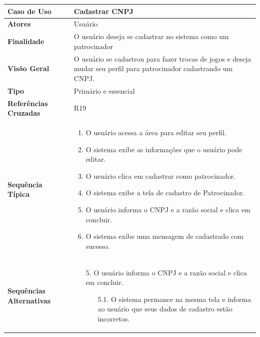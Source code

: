 \documentclass[a4paper,11pt]{article}
\begin{document}
\begin{table}[H]
		\begin{tabularx}{\textwidth}{|l|X|}
		\hline
			\textbf{Caso de Uso} &  Cadastrar CNPJ \\ \hline
			\textbf{Atores} &  Usuário  \\ \hline
			\textbf{Finalidade} & O usuário deseja se cadastrar no sistema como um patrocinador  \\ \hline
			\textbf{Visão Geral} & O usuário se cadastrou para fazer trocas de jogos e deseja mudar seu perfil para patrocinador cadastrando um CNPJ. \\ \hline
			\textbf{Tipo} & Primário e essencial  \\ \hline
			\textbf{Referências Cruzadas} &  R19 \\ \hline
			\textbf{Sequência Típica} & 
			
			\begin{enumerate}
			\item O usuário acessa a área para editar seu perfil.
			\item O sistema exibe as informações que o usuário pode editar.
			\item O usuário clica em cadastrar como patrocinador.
			\item O sistema exibe a tela de cadastro de Patrocinador.
			\item O usuário informa o CNPJ e a razão social e clica em concluir.
			\item O sistema exibe uma mensagem de cadastrado com sucesso.
			\end{enumerate} \\ \hline
			
			\textbf{Sequências Alternativas} & 
			\begin{itemize}
				\item[5.] O usuário informa o CNPJ e a razão social e clica em concluir.
				\begin{itemize}
					\item[5.1.] O sistema permance na mesma tela e informa ao usuário que seus dados de cadastro estão incorretos.
				\end{itemize}
			\end{itemize} \\ \hline
		\end{tabularx}
\end{table}
\end{document}
